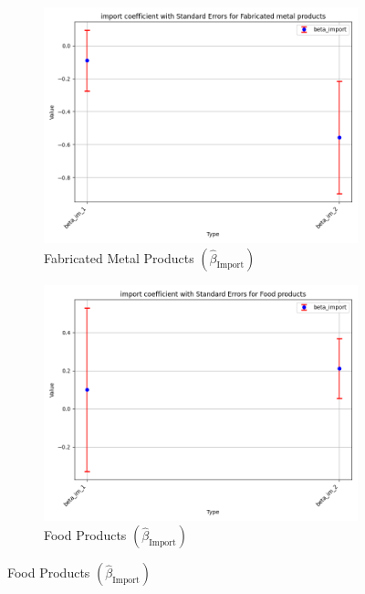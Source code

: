 \documentclass{article}
\begin{document}
\begin{figure}[ht!]
    \begin{subfigure}[t]{0.32\textwidth}
        \centering
        \includegraphics[width=\textwidth]{figure/empirical_stat_normal_kmshare_ciiu_beta_import_with_error_bars_Fabricated metal products.png}
        \caption{Fabricated Metal Products $(\hat{\beta}_{\text{Import}})$}
    \end{subfigure}
    \begin{subfigure}[t]{0.32\textwidth}
        \centering
        \includegraphics[width=\textwidth]{figure/empirical_stat_normal_kmshare_ciiu_beta_import_with_error_bars_Food products.png}
        \caption{Food Products $(\hat{\beta}_{\text{Import}})$}
    \end{subfigure}

\end{figure}
\end{document}
